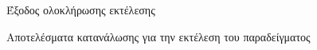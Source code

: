 \begin{figure}[h]
    \centering
    \caption{Έξοδος ολοκλήρωσης εκτέλεσης \mcpat}
    \label{fig:chap7_mcpat_output}
\end{figure}

\begin{figure}[h]
    \centering
    \caption{Αποτελέσματα κατανάλωσης για την εκτέλεση του παραδείγματος}
    \label{fig:chap7_mcpat_results_output}
\end{figure}

